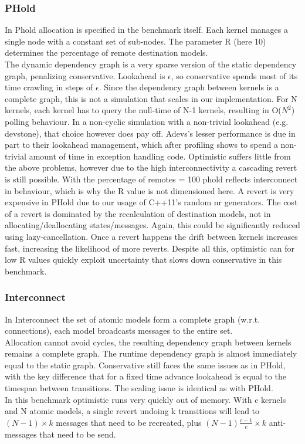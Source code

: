 \subsubsection{PHold}
In Phold allocation is specified in the benchmark itself. Each kernel manages a single node with a constant set of sub-nodes. The parameter R (here 10) determines the percentage of remote destination models.\\
The dynamic dependency graph is a very sparse version of the static dependency graph, penalizing conservative. Lookahead is $\epsilon$, so conservative spends most of its time crawling in steps of $\epsilon$. Since the dependency graph between kernels is a complete graph, this is not a simulation that scales in our implementation. For N kernels, each kernel has to query the null-time of N-1 kernels, resulting in O($N^2$) polling behaviour. In a non-cyclic simulation with a non-trivial lookahead (e.g. devstone), that choice however does pay off. Adevs's lesser performance is due in part to their lookahead management, which after profiling shows to spend a non-trivial amount of time in exception handling code. 
Optimistic suffers little from the above problems, however due to the high interconnectivity a cascading revert is still possible. With the percentage of remotes = 100 phold reflects interconnect in behaviour, which is why the R value is not dimensioned here. A revert is very expensive in PHold due to our usage of C++11's random nr generators. The cost of a revert is dominated by the recalculation of destination models, not in allocating/deallocating states/messages. Again, this could be significantly reduced using lazy-cancellation. Once a revert happens the drift between kernels increases fast, increasing the likelihood of more reverts. Despite all this, optimistic can for low R values quickly exploit uncertainty that slows down conservative in this benchmark.
\subsubsection{Interconnect}
In Interconnect
the set of atomic models form a complete graph (w.r.t. connections), each model broadcasts messages to the entire set. \\
Allocation cannot avoid cycles, the resulting dependency graph between kernels remains a complete graph. The runtime dependency graph is almost immediately equal to the static graph.
Conservative still faces the same issues as in PHold, with the key difference that for a fixed time advance lookahead is equal to the timespan between transitions. The scaling issue is identical as with PHold.\\
In this benchmark optimistic runs very quickly out of memory. With c kernels and N atomic models, a single revert undoing k transitions will lead to $(N-1)\times k$ messages that need to be recreated, plus $(N-1) \frac{c-1}{c} \times k$ anti-messages that need to be send.

